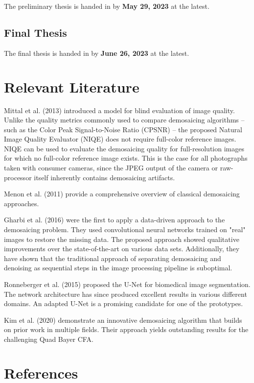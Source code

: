\documentclass[english,notitlepage,smartquotes]{hgbreport}
\begin{document}
The preliminary thesis is handed in by \textbf{May 29, 2023} at the latest.

\subsection{Final Thesis}

The final thesis is handed in by \textbf{June 26, 2023} at the latest.

\section{Relevant Literature}

Mittal et al. (2013) \cite{Mittal2013} introduced a model for blind evaluation of image quality. 
Unlike the quality metrics commonly used to compare demosaicing algorithms -- such as the Color Peak Signal-to-Noise Ratio (CPSNR) \cite{Menon2011} -- the proposed Natural Image Quality Evaluator (NIQE) does not require full-color reference images. 
NIQE can be used to evaluate the demosaicing quality for full-resolution images for which no full-color reference image exists. 
This is the case for all photographs taken with consumer cameras, since the JPEG output of the camera or raw-processor itself inherently contains demosaicing artifacts.

Menon et al. (2011) \cite{Menon2011} provide a comprehensive overview of classical demosaicing approaches.

Gharbi et al. (2016) \cite{Gharbi2016} were the first to apply a data-driven approach to the demosaicing problem. 
They used convolutional neural networks trained on "real" images to restore the missing data. 
The proposed approach showed qualitative improvements over the state-of-the-art on various data sets. 
Additionally, they have shown that the traditional approach of separating demosaicing and denoising as sequential steps in the image processing pipeline is suboptimal.

Ronneberger et al. (2015) \cite{Ronneberger2015} proposed the U-Net for biomedical image segmentation. 
The network architecture has since produced excellent results in various different domains. 
An adapted U-Net is a promising candidate for one of the prototypes.

Kim et al. (2020) \cite{Kim2020} demonstrate an innovative demosaicing algorithm that builds on prior work in multiple fields. 
Their approach yields outstanding results for the challenging Quad Bayer CFA.

  
\section*{References}

\printbibliography[heading=noheader]

\end{document}
